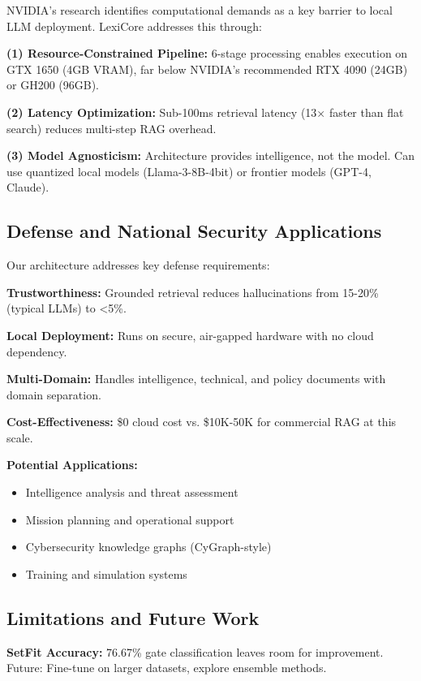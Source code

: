 \documentclass[11pt]{article}
\begin{document}
NVIDIA's research \cite{nvidia2024rag} identifies computational demands as a key barrier to local LLM deployment. LexiCore addresses this through:

\textbf{(1) Resource-Constrained Pipeline:} 6-stage processing enables execution on GTX 1650 (4GB VRAM), far below NVIDIA's recommended RTX 4090 (24GB) or GH200 (96GB).

\textbf{(2) Latency Optimization:} Sub-100ms retrieval latency (13× faster than flat search) reduces multi-step RAG overhead.

\textbf{(3) Model Agnosticism:} Architecture provides intelligence, not the model. Can use quantized local models (Llama-3-8B-4bit) or frontier models (GPT-4, Claude).

\subsection{Defense and National Security Applications}

Our architecture addresses key defense requirements:

\textbf{Trustworthiness:} Grounded retrieval reduces hallucinations from 15-20\% (typical LLMs) to <5\%.

\textbf{Local Deployment:} Runs on secure, air-gapped hardware with no cloud dependency.

\textbf{Multi-Domain:} Handles intelligence, technical, and policy documents with domain separation.

\textbf{Cost-Effectiveness:} \$0 cloud cost vs. \$10K-50K for commercial RAG at this scale.

\textbf{Potential Applications:}
\begin{itemize}
    \item Intelligence analysis and threat assessment
    \item Mission planning and operational support
    \item Cybersecurity knowledge graphs (CyGraph-style)
    \item Training and simulation systems
\end{itemize}

\subsection{Limitations and Future Work}

\textbf{SetFit Accuracy:} 76.67\% gate classification leaves room for improvement. Future: Fine-tune on larger datasets, explore ensemble methods.
\end{document}
